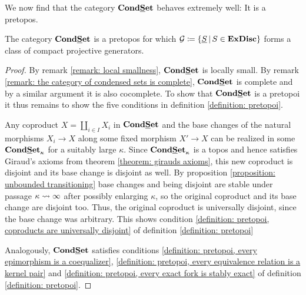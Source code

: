 We now find that the category ${{{\mathbf{Cond}}}{{\mathbf{\underline{S}et}}}}$ behaves extremely well: It is a pretopos.
\begin{theorem}
	\label{theorem: the pretopos of condensed sets}
	
	The category ${{{\mathbf{Cond}}}{{\mathbf{\underline{S}et}}}}$ is a pretopos for which $\mathcal G\coloneqq \{\underline{S}\,\vert\, S\in {\mathbf{ExDisc}}\}$ forms a class of compact projective generators.
\end{theorem}
\begin{proof}
	By remark \ref{remark: local smallness}, ${{{\mathbf{Cond}}}{{\mathbf{\underline{S}et}}}}$ is locally small. By remark \ref{remark: the category of condensed sets is complete}, ${{{\mathbf{Cond}}}{{\mathbf{\underline{S}et}}}}$ is complete and by a similar argument it is also cocomplete. To show that ${{{\mathbf{Cond}}}{{\mathbf{\underline{S}et}}}}$ is a pretopoi it thus remains to show the five conditions in definition \ref{definition: pretopoi}.
	
	Any coproduct $X=\coprod_{i\in I} X_i$ in ${{{\mathbf{Cond}}}{{\mathbf{\underline{S}et}}}}$ and the base changes of the natural morphisms $X_i\to X$ along some fixed morphism $X'\to X$ can be realized in some ${{{\mathbf{Cond}}}{{\mathbf{\underline{S}et}}}_{\kappa}}$ for a suitably large $\kappa$. Since ${{{\mathbf{Cond}}}{{\mathbf{\underline{S}et}}}_{\kappa}}$ is a topos and hence satisfies Giraud's axioms from theorem \ref{theorem: girauds axioms}, this new coproduct is disjoint and its base change is disjoint as well. By proposition \ref{proposition: unbounded transitioning} base changes and being disjoint are stable under passage ${\kappa\rightsquigarrow \infty}$ after possibly enlarging $\kappa$, so the original coproduct and its base change are disjoint too. Thus, the original coproduct is universally disjoint, since the base change was arbitrary. This shows condition \ref{definition: pretopoi, coproducts are universally disjoint} of definition \ref{definition: pretopoi}
	
	Analogously, ${{{\mathbf{Cond}}}{{\mathbf{\underline{S}et}}}}$ satisfies conditions \ref{definition: pretopoi, every epimorphism is a coequalizer}, \ref{definition: pretopoi, every equivalence relation is a kernel pair} and \ref{definition: pretopoi, every exact fork is stably exact} of definition \ref{definition: pretopoi}.
	

\end{proof}
